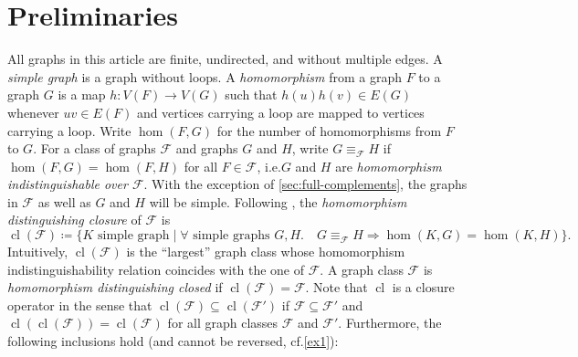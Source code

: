 \documentclass[3p,final]{elsarticle}
\DeclareMathOperator{\cl}{cl}
\begin{document}
	\section{Preliminaries}
	
	All graphs in this article are finite, undirected, and without multiple edges. 
	A \emph{simple graph} is a graph without loops.
	A \emph{homomorphism} from a graph $F$ to a graph $G$ is a map $h \colon V(F) \to V(G)$ such that $h(u)h(v) \in E(G)$ whenever $uv \in E(F)$ and vertices carrying a loop are mapped to vertices carrying a loop. Write $\hom(F, G)$ for the number of homomorphisms from $F$ to $G$. 
	For a class of graphs $\mathcal{F}$ and graphs $G$ and $H$, write $G \equiv_{\mathcal{F}} H$ if $\hom(F, G) = \hom(F, H)$ for all $F \in \mathcal{F}$, i.e.\@ $G$ and $H$ are \emph{homomorphism indistinguishable over $\mathcal{F}$}.
	With the exception of \cref{sec:full-complements}, the graphs in $\mathcal{F}$ as well as $G$ and $H$ will be simple.
	Following \cite{roberson_oddomorphisms_2022}, the \emph{homomorphism distinguishing closure} of $\mathcal{F}$ is
	\[
		\cl(\mathcal{F}) \coloneqq \{K \text{ simple graph} \mid \forall  \text{ simple graphs } G, H.\quad G \equiv_{\mathcal{F}} H \Rightarrow \hom(K, G) = \hom(K, H) \}.
	\]
	Intuitively, $\cl(\mathcal{F})$ is the \enquote{largest} graph class whose homomorphism indistinguishability relation coincides with the one of $\mathcal{F}$.
	A graph class $\mathcal{F}$ is \emph{homomorphism distinguishing closed} if $\cl(\mathcal{F}) = \mathcal{F}$.
	Note that $\cl$ is a closure operator in the sense that $\cl(\mathcal{F}) \subseteq \cl(\mathcal{F}')$ if $\mathcal{F} \subseteq \mathcal{F}'$ and $\cl(\cl(\mathcal{F})) = \cl(\mathcal{F})$ for all graph classes $\mathcal{F}$ and $\mathcal{F}'$.
	Furthermore, the following inclusions hold (and cannot be reversed, cf.\@ \cref{ex1}):
	
\end{document}
